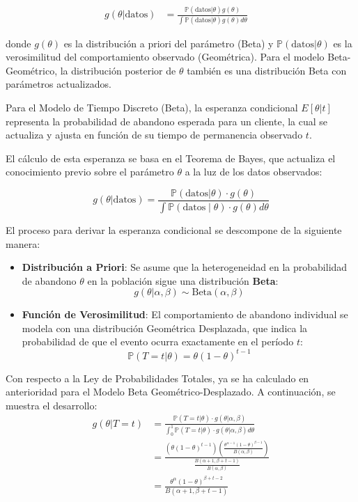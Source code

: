 \documentclass[
]{book}
\begin{document}
\[ 
\begin{aligned}
g(\theta|\text{datos}) &= \frac{\mathbb{P}(\text{datos}|\theta)g(\theta)}{\int \mathbb{P}(\text{datos}|\theta)g(\theta)d\theta}
\end{aligned}
\quad \label{eq:thetabayes} \]

donde \(g(\theta)\) es la distribución a priori del parámetro (Beta) y
\(\mathbb{P}(\text{datos}|\theta)\) es la verosimilitud del comportamiento
observado (Geométrica). Para el modelo Beta-Geométrico, la distribución
posterior de \(\theta\) también es una distribución Beta con parámetros
actualizados.

Para el Modelo de Tiempo Discreto (Beta), la esperanza condicional
\(E[\theta|t]\) representa la probabilidad de abandono esperada para un
cliente, la cual se actualiza y ajusta en función de su tiempo de
permanencia observado \(t\).

El cálculo de esta esperanza se basa en el Teorema de Bayes, que
actualiza el conocimiento previo sobre el parámetro \(\theta\) a la luz de
los datos observados:

\[ g(\theta|\text{datos}) = \frac{\mathbb{P}(\text{datos}|\theta) \cdot g(\theta)}{\int \mathbb{P}(\text{datos} \mid \theta) \cdot g(\theta) d\theta} \]

El proceso para derivar la esperanza condicional se descompone de la
siguiente manera:

\begin{itemize}
\item
  \textbf{Distribución a Priori}: Se asume que la heterogeneidad en la
  probabilidad de abandono \(\theta\) en la población sigue una
  distribución \textbf{Beta}:
  \[ g(\theta|\alpha, \beta) \sim \text{Beta}(\alpha, \beta) \]
\item
  \textbf{Función de Verosimilitud}: El comportamiento de abandono
  individual se modela con una distribución Geométrica Desplazada, que
  indica la probabilidad de que el evento ocurra exactamente en el
  período \(t\): \[ \mathbb{P}(T=t|\theta) = \theta(1-\theta)^{t-1} \]
\end{itemize}

Con respecto a la Ley de Probabilidades Totales, ya se ha calculado en
anterioridad para el Modelo Beta Geométrico-Desplazado. A continuación,
se muestra el desarrollo: \[
\begin{aligned}
g(\theta|T=t) &= \frac{\mathbb{P}(T=t|\theta) \cdot g(\theta|\alpha, \beta)}{\int_0^1 \mathbb{P}(T=t|\theta) \cdot g(\theta|\alpha, \beta) d\theta} \\
&= \frac{ \left( \theta(1-\theta)^{t-1} \right) \left( \frac{\theta^{\alpha-1}(1-\theta)^{\beta-1}}{B(\alpha, \beta)} \right) }{ \frac{B(\alpha+1, \beta+t-1)}{B(\alpha, \beta)} } \\
&= \frac{\theta^{\alpha}(1-\theta)^{\beta+t-2}}{B(\alpha+1, \beta+t-1)}
\end{aligned}
\]
\end{document}
